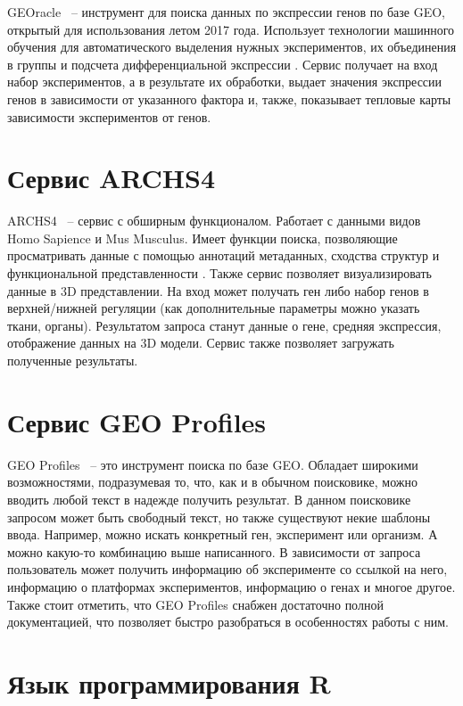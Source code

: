 \documentclass[times,specification,annotation]{itmo-student-thesis}
\begin{document}
GEOracle \cite{GEOracle} ~-- инструмент для поиска данных по экспрессии генов по базе GEO, открытый для использования летом 2017 года. Использует технологии машинного обучения для автоматического выделения нужных экспериментов, их объединения в группы и подсчета дифференциальной экспрессии \cite{GEOracleArticle}. Сервис получает на вход набор экспериментов, а в результате их обработки, выдает значения экспрессии генов в зависимости от указанного фактора и, также, показывает тепловые карты зависимости экспериментов от генов.

\section{Сервис ARCHS4}

ARCHS4 \cite{ARCHS4} ~-- сервис с обширным функционалом. Работает с данными видов Homo Sapience и Mus Musculus. Имеет функции поиска, позволяющие просматривать данные с помощью аннотаций метаданных, сходства структур и функциональной представленности \cite{ARCHS4help}. Также сервис позволяет визуализировать данные в 3D представлении. На вход может получать ген либо набор генов в верхней/нижней регуляции (как дополнительные параметры можно указать ткани, органы). Результатом запроса станут данные о гене, средняя экспрессия, отображение данных на 3D модели. Сервис также позволяет загружать полученные результаты. 

\section{Сервис GEO Profiles}

GEO Profiles \cite{GEOprofiles} ~-- это инструмент поиска по базе GEO. Обладает широкими возможностями, подразумевая то, что, как и в обычном поисковике, можно вводить любой текст в надежде получить результат. В данном поисковике запросом может быть свободный текст, но также существуют некие шаблоны ввода. Например, можно искать конкретный ген, эксперимент или организм. А можно какую-то комбинацию выше написанного. В зависимости от запроса пользователь может получить информацию об эксперименте со ссылкой на него, информацию о платформах экспериментов, информацию о генах и многое другое. Также стоит отметить, что GEO Profiles снабжен достаточно полной документацией, что позволяет быстро разобраться в особенностях работы с ним.

\section{Язык программирования R}
\end{document}
